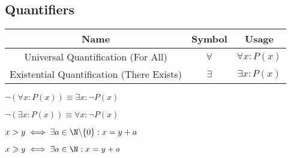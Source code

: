 \documentclass{article}
\begin{document}
\subsection{Quantifiers}
\begin{table}[H]
    \centering
    \begin{tabular}{c c c}
        \textbf{Name}                             & \textbf{Symbol} & \textbf{Usage}     \\
        \midrule
        Universal Quantification (For All)        & \(\forall\)     & \(\forall x:P(x)\) \\
        Existential Quantification (There Exists) & \(\exists\)     & \(\exists x:P(x)\) \\
    \end{tabular}\label{tab:Quantifiers}
\end{table}
%
\begin{theorem}
    \(\neg{\left(\forall x:P(x)\right)} \equiv \exists x:\neg P(x)\)
\end{theorem}
%
\begin{theorem}
    \(\neg{\left(\exists x:P(x)\right)} \equiv \forall x:\neg P(x)\)
\end{theorem}
%
\begin{definition}
    \(x > y \iff \exists a \in \N\backslash\{0\} : x=y+a\)
\end{definition}
%
\begin{definition}
    \(x \geqslant y \iff \exists a \in \N : x=y+a\)
\end{definition}
%
\end{document}
